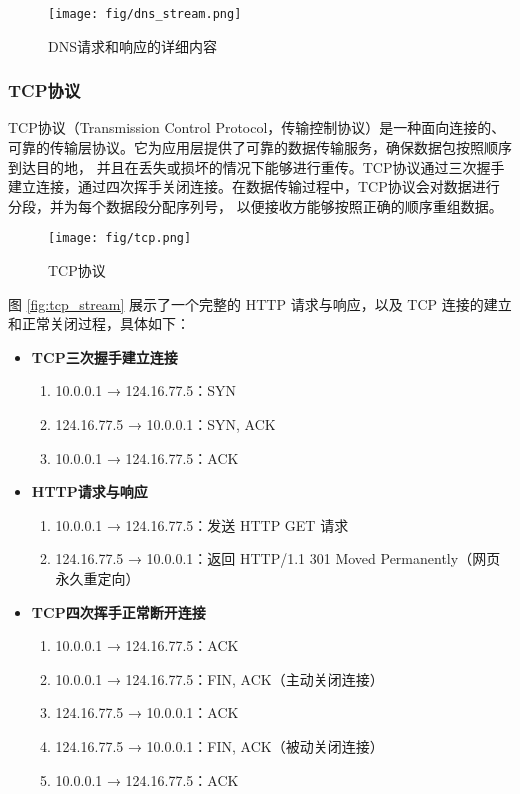 \documentclass[11pt]{article}
\begin{document}
\begin{figure}[H]
  \centering
  \texttt{[image: fig/dns\_stream.png]}
  \caption{DNS请求和响应的详细内容}
  \label{fig:dns_stream}
\end{figure}

\subsubsection{TCP协议}
TCP协议（Transmission Control Protocol，传输控制协议）是一种面向连接的、可靠的传输层协议。它为应用层提供了可靠的数据传输服务，确保数据包按照顺序到达目的地，
并且在丢失或损坏的情况下能够进行重传。TCP协议通过三次握手建立连接，通过四次挥手关闭连接。在数据传输过程中，TCP协议会对数据进行分段，并为每个数据段分配序列号，
以便接收方能够按照正确的顺序重组数据。

\begin{figure}[H]
  \centering
  \texttt{[image: fig/tcp.png]}
  \caption{TCP协议}
  \label{fig:tcp}
\end{figure}

图 \ref{fig:tcp_stream} 展示了一个完整的 HTTP 请求与响应，以及 TCP 连接的建立和正常关闭过程，具体如下：
\begin{itemize}
  \item \textbf{TCP三次握手建立连接}
  \begin{enumerate}
    \item 10.0.0.1 → 124.16.77.5：SYN
    \item 124.16.77.5 → 10.0.0.1：SYN, ACK
    \item 10.0.0.1 → 124.16.77.5：ACK
  \end{enumerate}

  \item \textbf{HTTP请求与响应}
  \begin{enumerate}
    \item 10.0.0.1 → 124.16.77.5：发送 HTTP GET 请求
    \item 124.16.77.5 → 10.0.0.1：返回 HTTP/1.1 301 Moved Permanently（网页永久重定向）
  \end{enumerate}

  \item \textbf{TCP四次挥手正常断开连接}
  \begin{enumerate}
    \item 10.0.0.1 → 124.16.77.5：ACK
    \item 10.0.0.1 → 124.16.77.5：FIN, ACK（主动关闭连接）
    \item 124.16.77.5 → 10.0.0.1：ACK
    \item 124.16.77.5 → 10.0.0.1：FIN, ACK（被动关闭连接）
    \item 10.0.0.1 → 124.16.77.5：ACK
  \end{enumerate}
\end{itemize}
\end{document}
